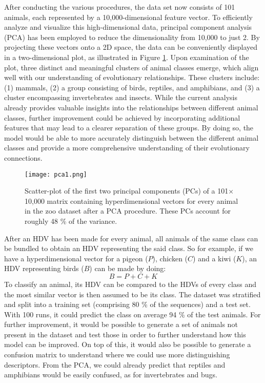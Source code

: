 After conducting the various procedures, the data set now consists of 101 animals, each represented by a 10,000-dimensional feature vector. To efficiently analyze and visualize this high-dimensional data, principal component analysis (PCA) has been employed to reduce the dimensionality from 10,000 to just 2. By projecting these vectors onto a 2D space, the data can be conveniently displayed in a two-dimensional plot, as illustrated in Figure \ref{fig:exm2}. Upon examination of the plot, three distinct and meaningful clusters of animal classes emerge, which align well with our understanding of evolutionary relationships. These clusters include: (1) mammals, (2) a group consisting of birds, reptiles, and amphibians, and (3) a cluster encompassing invertebrates and insects. While the current analysis already provides valuable insights into the relationships between different animal classes, further improvement could be achieved by incorporating additional features that may lead to a clearer separation of these groups. By doing so, the model would be able to more accurately distinguish between the different animal classes and provide a more comprehensive understanding of their evolutionary connections.
\begin{figure}[h]
    \centering
    \texttt{[image: pca1.png]}
    \caption{Scatter-plot of the first two principal components (PCs) of a 101$\times$10,000 matrix containing hyperdimensional vectors for every animal in the zoo dataset after a PCA procedure. These PCs account for roughly 48 \% of the variance.}
    \label{fig:exm2}
\end{figure}

After an HDV has been made for every animal, all animals of the same class can be bundled to obtain an HDV representing the said class. So for example, if we have a hyperdimensional vector for a pigeon ($P$), chicken ($C$) and a kiwi ($K$), an HDV representing birds ($B$) can be made by doing:
\begin{equation}
    B = P + C + K
\end{equation} 
To classify an animal, its HDV can be compared to the HDVs of every class and the most similar vector is then assumed to be its class. The dataset was stratified and split into a training set (comprising 80 \% of the sequences) and a test set. With 100 runs, it could predict the class on average 94 \% of the test animals. For further improvement, it would be possible to generate a set of animals not present in the dataset and test those in order to further understand how this model can be improved. On top of this, it would also be possible to generate a confusion matrix to understand where we could use more distinguishing descriptors. From the PCA, we could already predict that reptiles and amphibians would be easily confused, as for invertebrates and bugs.
